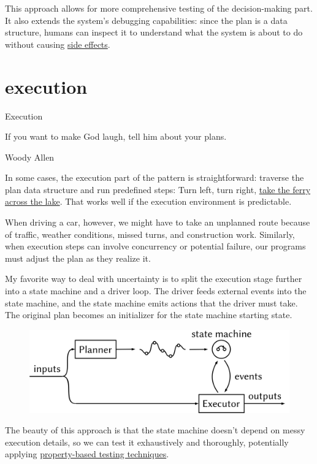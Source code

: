 \documentclass{article}
\begin{document}
This approach allows for more comprehensive testing of the decision-making part.
It also extends the system's debugging capabilities: since the plan is a data structure, humans can inspect it to understand what the system is about to do without causing \href{https://en.wikipedia.org/wiki/Side_effect_(computer_science)}{side effects}.

\section{execution}{Execution}

\epigraph{If you want to make God laugh, tell him about your plans.}{Woody Allen}

In some cases, the execution part of the pattern is straightforward: traverse the plan data structure and run predefined steps:
Turn left, turn right, \href{https://xkcd.com/461/}{take the ferry across the lake}.
That works well if the execution environment is predictable.

When driving a car, however, we might have to take an unplanned route because of traffic, weather conditions, missed turns, and construction work.
Similarly, when execution steps can involve concurrency or potential failure, our programs must adjust the plan as they realize it.

My favorite way to deal with uncertainty is to split the execution stage further into a state machine and a driver loop.
The driver feeds external events into the state machine, and the state machine emits actions that the driver must take.
The original plan becomes an initializer for the state machine starting state.

\begin{figure}[grayscale-diagram]
\includegraphics{images/29-dynamic-planning.svg}
\end{figure}

The beauty of this approach is that the state machine doesn't depend on messy execution details,
so we can test it exhaustively and thoroughly,
potentially applying \href{https://propertesting.com/book_state_machine_properties.html}{property-based testing techniques}.
\end{document}
